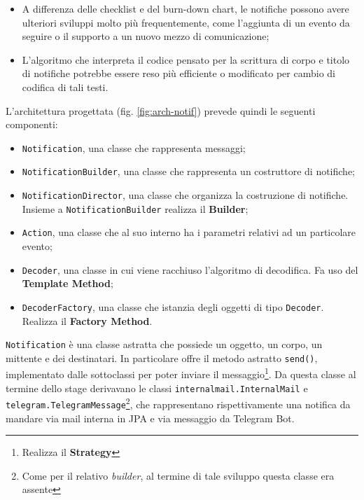\begin{itemize}
\item A differenza delle checklist e del burn-down chart, le notifiche possono
  avere ulteriori sviluppi molto più frequentemente, come l'aggiunta di un
  evento da seguire o il supporto a un nuovo mezzo di comunicazione;
\item L'algoritmo che interpreta il codice pensato per la scrittura di corpo e
  titolo di notifiche potrebbe essere reso più efficiente o modificato per
  cambio di codifica di tali testi.
\end{itemize}

L'architettura progettata (fig. \ref{fig:arch-notif}) prevede quindi le
seguenti componenti:

\begin{itemize}
\item \texttt{Notification}, una classe che rappresenta messaggi;
\item \texttt{NotificationBuilder}, una classe che rappresenta un costruttore
  di notifiche;
\item \texttt{NotificationDirector}, una classe che organizza la costruzione
  di notifiche. Insieme a \texttt{NotificationBuilder} realizza il
   \textbf{Builder};
\item \texttt{Action}, una classe che al suo interno ha i parametri relativi
  ad un particolare evento;
\item \texttt{Decoder}, una classe in cui viene racchiuso l'algoritmo di
  decodifica. Fa uso del  \textbf{Template Method};
\item \texttt{DecoderFactory}, una classe che istanzia degli oggetti di tipo
  \texttt{Decoder}. Realizza il  \textbf{Factory Method}.
\end{itemize}

\texttt{Notification} è una classe astratta che possiede un oggetto, un corpo,
un mittente e dei destinatari. In particolare offre il metodo astratto
\texttt{send()}, implementato dalle sottoclassi per poter inviare il
messaggio\footnote{Realizza il  \textbf{Strategy}}. Da
questa classe al termine dello stage derivavano le classi
\texttt{internalmail.InternalMail} e
\texttt{telegram.TelegramMessage}\footnote{Come per il relativo
\emph{builder}, al termine di tale sviluppo questa classe era assente}, che
rappresentano rispettivamente una notifica da mandare via mail interna in JPA
e via messaggio da Telegram Bot.

